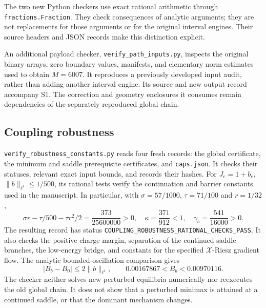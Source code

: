 \documentclass[10pt]{article}
\newcommand{\X}{\mathcal X}
\newcommand{\code}[1]{\nolinkurl{#1}}
\begin{document}
The two new Python checkers use exact rational arithmetic through
\code{fractions.Fraction}. They check consequences of analytic arguments;
they are not replacements for those arguments or for the original interval
engines. Their source headers and JSON records make this distinction
explicit.

An additional payload checker, \code{verify_path_inputs.py}, inspects the
original binary arrays, zero boundary values, manifests, and elementary
norm estimates used to obtain $M=6007$. It reproduces a previously
developed input audit, rather than adding another interval engine. Its
source and new output record accompany S1. The correction and geometry
enclosures it consumes remain dependencies of the separately reproduced
global chain.

\subsection*{Coupling robustness}
\code{verify_robustness_constants.py} reads four fresh records: the global
certificate, the minimum and saddle prerequisite certificates, and
\code{caps.json}. It checks their statuses, relevant exact input bounds,
and records their hashes. For $J_e=1+b_e$, $\|b\|_{\ell^1}\le1/500$, its rational tests
verify the continuation and barrier constants used in the manuscript.
In particular, with $\sigma=57/1000$, $\tau=71/100$ and $r=1/32$,
\[
 \sigma r-\tau/500-\tau r^2/2
 =\frac{373}{25600000}>0,\quad
 \kappa=\frac{371}{912}<1,\quad
 \gamma_b=\frac{541}{16000}>0.
\]
The resulting record has status
\code{COUPLING_ROBUSTNESS_RATIONAL_CHECKS_PASS}. It also checks the positive
charge margin, separation of the continued saddle branches, the low-energy
bridge, and constants for the specified $\X$-Riesz gradient flow. The
analytic bounded-oscillation comparison gives
\[
 |B_b-B_0|\le2\|b\|_{\ell^1},\qquad
 0.00167867<B_b<0.00970116.
\]
The checker neither solves new perturbed equilibria numerically nor
reexecutes the old global chain. It does not show that a perturbed minimax
is attained at a continued saddle, or that the dominant mechanism changes.
\end{document}
